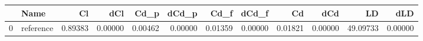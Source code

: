 \begin{tabular}{llrrrrrrrrrr}
\toprule
{} &       Name &      Cl &     dCl &    Cd\_p &   dCd\_p &    Cd\_f &   dCd\_f &      Cd &     dCd &       LD &     dLD \\
\midrule
0 &  reference & 0.89383 & 0.00000 & 0.00462 & 0.00000 & 0.01359 & 0.00000 & 0.01821 & 0.00000 & 49.09733 & 0.00000 \\
\bottomrule
\end{tabular}
